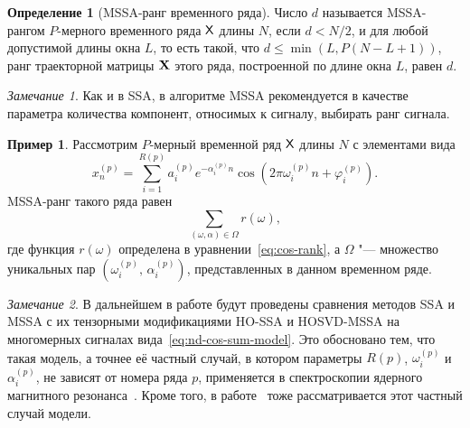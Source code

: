 \documentclass[specialist,
    substylefile = spbu.rtx,
    subf,href,colorlinks=true, 12pt]{disser}
\theoremstyle{plain}
\theoremstyle{definition}
\newtheorem{definition}{Определение}[section]
\newtheorem{example}{Пример}[section]
\theoremstyle{remark}
\newtheorem*{remark}{Замечание}
\begin{document}
    \begin{definition}[MSSA-ранг временного ряда]
        \label{def:mssa-rank}
        Число $d$ называется MSSA-рангом $P$-мерного временного ряда $\mathsf{X}$ длины $N$, если $d < N / 2$, и для любой допустимой 
        длины окна $L$,
        то есть такой, что $d \leqslant \min(L, P(N- L + 1))$, ранг траекторной матрицы $\mathbf{X}$ этого ряда, 
        построенной по длине окна $L$, равен $d$.
    \end{definition}
    \begin{remark}
        Как и в SSA, в алгоритме MSSA рекомендуется в качестве параметра количества компонент, относимых к сигналу,
        выбирать ранг сигнала.
    \end{remark}
    \begin{example}
        \label{ex:mssa-ranks}
        Рассмотрим $P$-мерный временной ряд $\mathsf{X}$ длины $N$ с элементами вида
        \begin{equation}
            \label{eq:nd-cos-sum-model}
            x_n^{(p)} = \sum_{i=1}^{R(p)} a_i^{(p)} e^{-\alpha_i^{(p)} n}
            \cos\left(2 \pi \omega_i^{(p)} n + \varphi_i^{(p)}\right).
        \end{equation}
        MSSA-ранг такого ряда равен
        \begin{equation}
            \sum_{(\omega, \alpha)\in \Omega} r(\omega),
        \end{equation}
        где функция $r(\omega)$ определена в уравнении~\eqref{eq:cos-rank}, а $\Omega$ "--- множество уникальных пар
        $(\omega_i^{(p)},\, \alpha_i^{(p)})$, представленных в данном временном ряде.
    \end{example}
    
    \begin{remark}
        В дальнейшем в работе будут проведены сравнения методов SSA и MSSA с их тензорными модификациями 
        HO-SSA и HOSVD-MSSA на многомерных сигналах вида~\eqref{eq:nd-cos-sum-model}.
        Это обосновано тем, что такая модель, а точнее её частный случай, в котором параметры $R(p)$, $\omega_i^{(p)}$ и $\alpha_i^{(p)}$, не зависят от номера ряда $p$, применяется в спектроскопии ядерного магнитного резонанса~\cite{NMR}.
        Кроме того, в работе~\cite{hosvd-hooi-separation} тоже рассматривается этот частный случай модели.
    \end{remark}
    
\end{document}
